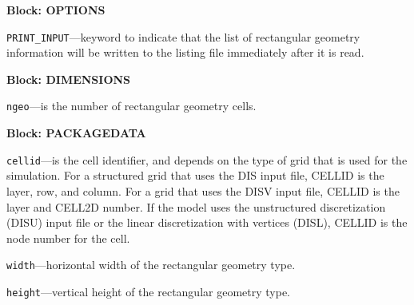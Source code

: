 
\item \textbf{Block: OPTIONS}

\begin{description}
\item \texttt{PRINT\_INPUT}---keyword to indicate that the list of rectangular geometry information will be written to the listing file immediately after it is read.

\end{description}
\item \textbf{Block: DIMENSIONS}

\begin{description}
\item \texttt{ngeo}---is the number of rectangular geometry cells.

\end{description}
\item \textbf{Block: PACKAGEDATA}

\begin{description}
\item \texttt{cellid}---is the cell identifier, and depends on the type of grid that is used for the simulation.  For a structured grid that uses the DIS input file, CELLID is the layer, row, and column.   For a grid that uses the DISV input file, CELLID is the layer and CELL2D number.  If the model uses the unstructured discretization (DISU) input file or the linear discretization with vertices (DISL), CELLID is the node number for the cell.

\item \texttt{width}---horizontal width of the rectangular geometry type.

\item \texttt{height}---vertical height of the rectangular geometry type.

\end{description}

